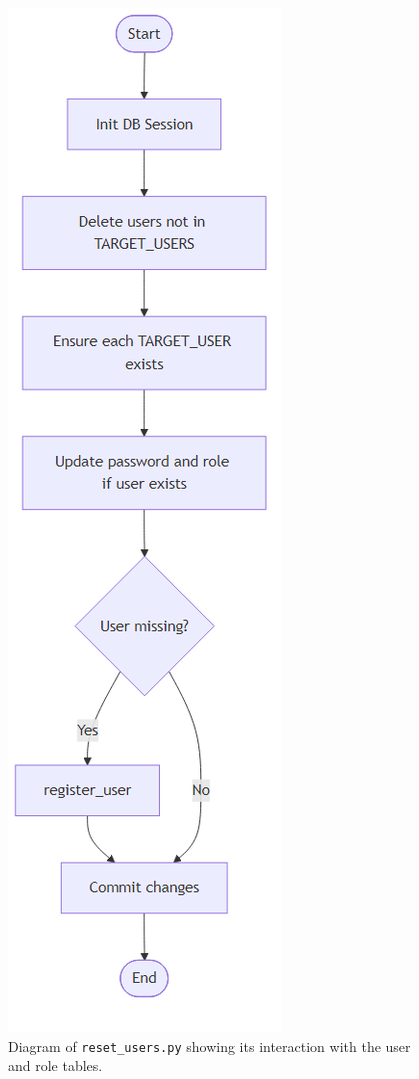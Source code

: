 \documentclass{report}
\begin{document}
\begin{figure}[ht]
    \centering
    \includegraphics[width=\textwidth,height=0.8\textheight,keepaspectratio]{png_files/reset_users_flow.png}
    \caption{Diagram of \texttt{reset\_users.py} showing its interaction with the user and role tables.}
\end{figure}
\end{document}
